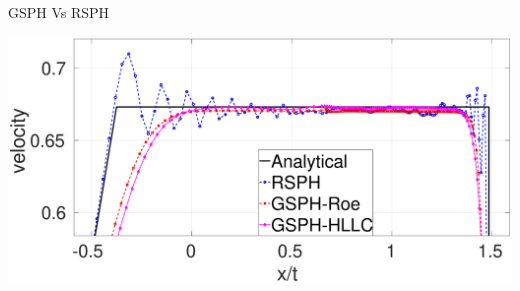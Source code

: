 \documentclass{beamer}
\begin{document}
\begin{frame}{GSPH Vs RSPH}
\begin{figure}[t]
\begin{minipage}{.33\textwidth}
    \end{minipage}%
\end{figure}

\begin{minipage}{0.35 \textwidth}
		\centering
        \includegraphics[width=0.99 \textwidth]{./Chapter-4/Figures/Sod/RCM-Sod-GSPH-compare-v-zoom}   
        

\end{minipage}
\end{frame}
\end{document}
